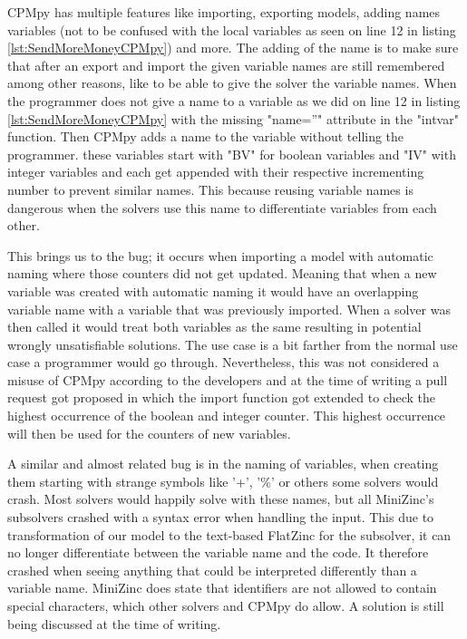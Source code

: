 CPMpy has multiple features like importing, exporting models, adding names variables (not to be confused with the local variables as seen on line 12 in listing \ref{lst:SendMoreMoneyCPMpy}) and more. The adding of the name is to make sure that after an export and import the given variable names are still remembered among other reasons, like to be able to give the solver the variable names. When the programmer does not give a name to a variable as we did on line 12 in listing \ref{lst:SendMoreMoneyCPMpy} with the missing "name=''" attribute in the "intvar" function. Then CPMpy adds a name to the variable without telling the programmer. these variables start with "BV" for boolean variables and "IV" with integer variables and each get appended with their respective incrementing number to prevent similar names. This because reusing variable names is dangerous when the solvers use this name to differentiate variables from each other.

This brings us to the bug; it occurs when importing a model with automatic naming where those counters did not get updated. Meaning that when a new variable was created with automatic naming it would have an overlapping variable name with a variable that was previously imported. When a solver was then called it would treat both variables as the same resulting in potential wrongly unsatisfiable solutions. The use case is a bit farther from the normal use case a programmer would go through. Nevertheless, this was not considered a misuse of CPMpy according to the developers and at the time of writing a pull request got proposed in which the import function got extended to check the highest occurrence of the boolean and integer counter. This highest occurrence will then be used for the counters of new variables.

A similar and almost related bug is in the naming of variables, when creating them starting with strange symbols like '+', '\%' or others some solvers would crash. Most solvers would happily solve with these names, but all MiniZinc's subsolvers crashed with a syntax error when handling the input. This due to transformation of our model to the text-based FlatZinc for the subsolver, it can no longer differentiate between the variable name and the code. It therefore crashed when seeing anything that could be interpreted differently than a variable name. MiniZinc does state that identifiers are not allowed to contain special characters, which other solvers and CPMpy do allow. A solution is still being discussed at the time of writing.


